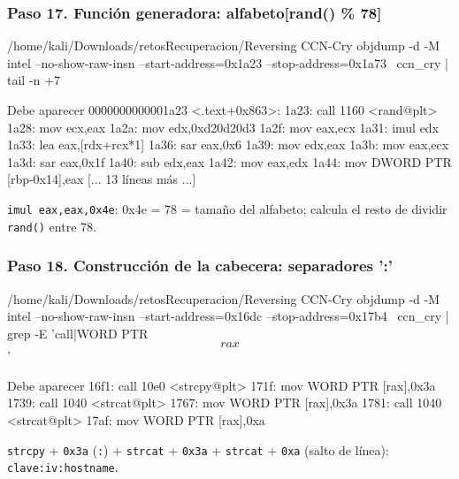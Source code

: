 \documentclass[11pt,a4paper]{article}
\begin{document}
\subsubsection*{Paso 17. Función generadora: alfabeto[rand() \% 78]}
\begin{comando}{/home/kali/Downloads/retosRecuperacion/Reversing CCN-Cry}
objdump -d -M intel --no-show-raw-insn --start-address=0x1a23 --stop-address=0x1a73 \
  ccn_cry | tail -n +7
\end{comando}
\begin{salida}{Debe aparecer}
0000000000001a23 <.text+0x863>:
    1a23:       call   1160 <rand@plt>
    1a28:       mov    ecx,eax
    1a2a:       mov    edx,0xd20d20d3
    1a2f:       mov    eax,ecx
    1a31:       imul   edx
    1a33:       lea    eax,[rdx+rcx*1]
    1a36:       sar    eax,0x6
    1a39:       mov    edx,eax
    1a3b:       mov    eax,ecx
    1a3d:       sar    eax,0x1f
    1a40:       sub    edx,eax
    1a42:       mov    eax,edx
    1a44:       mov    DWORD PTR [rbp-0x14],eax
[... 13 líneas más ...]
\end{salida}
\begin{nota}\texttt{imul eax,eax,0x4e}: 0x4e = 78 = tamaño del alfabeto; calcula el resto de dividir \texttt{rand()} entre 78.\end{nota}

\subsubsection*{Paso 18. Construcción de la cabecera: separadores ':'}
\begin{comando}{/home/kali/Downloads/retosRecuperacion/Reversing CCN-Cry}
objdump -d -M intel --no-show-raw-insn --start-address=0x16dc --stop-address=0x17b4 \
  ccn_cry | grep -E 'call|WORD PTR \[rax\]'
\end{comando}
\begin{salida}{Debe aparecer}
    16f1:       call   10e0 <strcpy@plt>
    171f:       mov    WORD PTR [rax],0x3a
    1739:       call   1040 <strcat@plt>
    1767:       mov    WORD PTR [rax],0x3a
    1781:       call   1040 <strcat@plt>
    17af:       mov    WORD PTR [rax],0xa
\end{salida}
\begin{nota}\texttt{strcpy} + \texttt{0x3a} (\texttt{:}) + \texttt{strcat} + \texttt{0x3a} + \texttt{strcat} + \texttt{0xa} (salto de línea): \texttt{clave:iv:hostname}.\end{nota}
\end{document}
